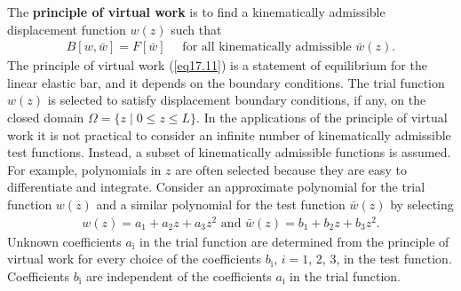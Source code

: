 \documentclass{AeroStructure-ERJohnson}
\begin{document}
The \textbf{principle of virtual work} is to find a kinematically admissible displacement function $w(z)$ such that
\begin{align}
B[w, \bar{w}]=F[\bar{w}] \quad \text { for all kinematically admissible } \bar{w}(z). \label{eq17.11}
\end{align}
The principle of virtual work (\ref{eq17.11}) is a statement of equilibrium for the linear elastic bar, and it depends on the boundary conditions. The trial function $w(z)$ is selected to satisfy displacement boundary conditions, if any, on the closed domain $\Omega=\{z \mid 0 \leq z \leq L\}$. In the applications of the principle of virtual work it is not practical to consider an infinite number of kinematically admissible test functions. Instead, a subset of kinematically admissible functions is assumed. For example, polynomials in $z$ are often selected because they are easy to differentiate and integrate. Consider an approximate polynomial for the trial function $w(z)$ and a similar polynomial for the test function $\bar{w}(z)$ by selecting
\begin{align}\label{eq17.12}
w(z)=a_{1}+a_{2} z+a_{3} z^{2} \textrm{ and } \bar{w}(z)=b_{1}+b_{2} z+b_{3} z^{2}.
\end{align}
Unknown coefficients $a_{\textrm{i}}$ in the trial\enlargethispage{-1\baselineskip} function are determined from the principle of virtual work for every choice of the coefficients $b_{\textrm{i}}$, $i= 1$, 2, 3, in the test function. Coefficients $b_{\textrm{i}}$ are independent of the coefficients $a_{\textrm{i}}$ in the trial function.

\clearpage
\end{document}
